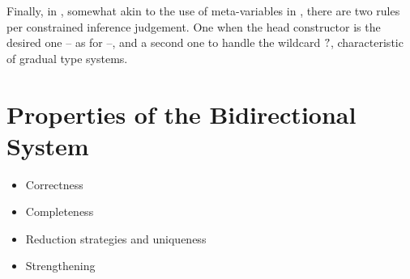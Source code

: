 Finally, in , somewhat akin to the use of meta-variables in
\textcite{Asperti2012}, there are two rules per constrained inference judgement.
One when the head constructor is the desired one – as for  –,
and a second one to handle the wildcard $\mathbb{?}$, characteristic of gradual type systems.


\section{Properties of the Bidirectional System}
\label{sec:bidir-prop}

\begin{itemize}
  \item Correctness
  \item Completeness
  \item Reduction strategies and uniqueness
  \item Strengthening
\end{itemize}